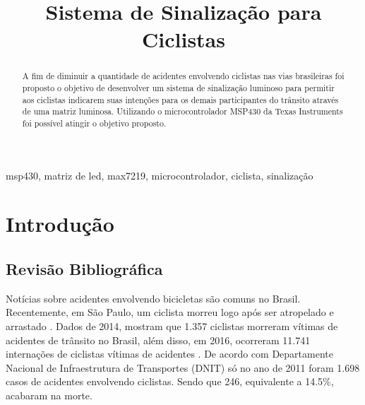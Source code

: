 \documentclass[conference]{IEEEtran}
\begin{document}
\title{Sistema de Sinalização para Ciclistas\\
}

\author{
  \and
}

\maketitle

\begin{abstract}
A fim de diminuir a quantidade de acidentes envolvendo ciclistas nas vias brasileiras
foi proposto o objetivo de desenvolver um sistema de sinalização luminoso para
permitir aos ciclistas indicarem suas intenções para os demais participantes do
trânsito através de uma matriz luminosa. Utilizando o microcontrolador MSP430 da
Texas Instruments foi possível atingir o objetivo proposto.
\end{abstract}

\begin{IEEEkeywords}
  msp430, matriz de led, max7219, microcontrolador, ciclista, sinalização
\end{IEEEkeywords}

\section{Introdução}

\subsection{Revisão Bibliográfica}
Notícias sobre acidentes envolvendo bicicletas são comuns no Brasil. Recentemente, em São Paulo, um ciclista morreu logo após ser atropelado e arrastado \cite{b1}. Dados de 2014, mostram que 1.357 ciclistas morreram vítimas de acidentes de trânsito no Brasil, além disso, em 2016, ocorreram 11.741 internações de ciclistas vítimas de acidentes \cite{b2}. De acordo com Departamente Nacional de Infraestrutura de Transportes (DNIT) \cite{b3} só no ano de 2011 foram 1.698 casos de acidentes envolvendo ciclistas. Sendo que 246, equivalente a 14.5\%, acabaram na morte.
\end{document}
